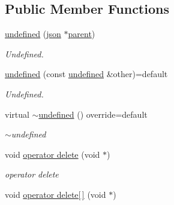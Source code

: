 \subsection*{Public Member Functions}
\begin{DoxyCompactItemize}
\item 
\hyperlink{classformat_1_1undefined_aeeee6253ddd4623b960d268222a61960}{undefined} (\hyperlink{classformat_1_1json}{json} $\ast$\hyperlink{classformat_1_1value_a86c03ec8810bfd0d60ec49095120040d}{parent})
\begin{DoxyCompactList}\small\item\em Undefined. \end{DoxyCompactList}\item 
\hyperlink{classformat_1_1undefined_a3a95a41b5fa665df9cd1d577ef1b5d2d}{undefined} (const \hyperlink{classformat_1_1undefined}{undefined} \&other)=default
\begin{DoxyCompactList}\small\item\em Undefined. \end{DoxyCompactList}\item 
virtual \hyperlink{classformat_1_1undefined_a9f05b932696e3e6b690b1ac29de3ed95}{$\sim$undefined} () override=default\hypertarget{classformat_1_1undefined_a9f05b932696e3e6b690b1ac29de3ed95}{}\label{classformat_1_1undefined_a9f05b932696e3e6b690b1ac29de3ed95}

\begin{DoxyCompactList}\small\item\em $\sim$undefined \end{DoxyCompactList}\item 
void \hyperlink{classformat_1_1undefined_a0338d8a0155940468e5e075e2ac70312}{operator delete} (void $\ast$)\hypertarget{classformat_1_1undefined_a0338d8a0155940468e5e075e2ac70312}{}\label{classformat_1_1undefined_a0338d8a0155940468e5e075e2ac70312}

\begin{DoxyCompactList}\small\item\em operator delete \end{DoxyCompactList}\item 
void \hyperlink{classformat_1_1undefined_ad3f119cd1bf17f5735d03dd92590b6d5}{operator delete\mbox{[}$\,$\mbox{]}} (void $\ast$)\hypertarget{classformat_1_1undefined_ad3f119cd1bf17f5735d03dd92590b6d5}{}\label{classformat_1_1undefined_ad3f119cd1bf17f5735d03dd92590b6d5}


\end{DoxyCompactItemize}
